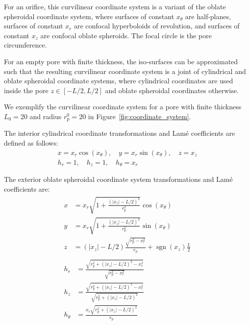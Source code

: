 \documentclass[10pt, a4paper]{article}
\begin{document}
\begin{multicols}{2}
For an orifice, this curvilinear coordinate system is a variant of the oblate spheroidal coordinate system, where surfaces of constant $x_{\theta}$ are half-planes, surfaces of constant $x_{r}$ are confocal hyperboloids of revolution, and surfaces of constant $x_{z}$ are confocal oblate spheroids.
The focal circle is the pore circumference.

For an empty pore with finite thickness, the iso-surfaces can be approximated such that the resulting curvilinear coordinate system is a joint of cylindrical and oblate spheroidal coordinate systems,
where cylindrical coordinates are used inside the pore $z \in [-L/2, L/2]$ and oblate spheroidal coordinates otherwise.

We exemplify the curvilinear coordinate system for a pore with finite thickness $L_{0} = 20$ and radius $r_{\text{p}}^{0} = 20$ in Figure~\ref{fig:coordinate_system}.

The interior cylindrical coordinate transformations and Lam\'e coefficients are defined as follows:
\begin{gather}
    \label{eq:cyl_transformation_1}
    x = x_r \cos(x_{\theta}), \quad
    y = x_r \sin(x_{\theta}), \quad
    z = x_z
    \\
    \label{eq:cyl_transformation_2}
    h_r = 1, \quad
    h_z = 1, \quad
    h_{\theta} = x_r
\end{gather}

The exterior oblate spheroidal coordinate system transformations and Lam\'e coefficients are:
\begin{gather}
    \begin{aligned}\label{eq:oblate_spheroid_transformation_1}
        x &= x_r
        \sqrt{1 + \frac{(|x_z| - L/2)^2}{r_{\text{p}}^2}}
        \cos(x_{\theta})
        \\
        y &= x_r
        \sqrt{1 + \frac{(|x_z| - L/2)^2}{r_{\text{p}}^2}}
        \sin(x_{\theta})
        \\
        z &= (|x_z| - L/2) \frac{\sqrt{r_{\text{p}}^2 - x_r^2}}{r_{\text{p}}} + \operatorname{sgn}(x_z) \frac{L}{2}
    \end{aligned}
    \\[4pt]
    \begin{aligned}\label{eq:oblate_spheroid_transformation_2}
        h_r &= \frac{\sqrt{r_{\text{p}}^2 + (|x_z| - L/2)^2 - x_r^2}}{\sqrt{r_{\text{p}}^2 - x_r^2}}
        \\
        h_z &= \frac{\sqrt{r_{\text{p}}^2 + (|x_z| - L/2)^2 - x_r^2}}{\sqrt{r_{\text{p}}^2 + (|x_z| - L/2)^2}}
        \\
        h_{\theta} &= \frac{x_r \sqrt{r_{\text{p}}^2 + (|x_z| - L/2)^2}}{r_{\text{p}}}
    \end{aligned}
\end{gather}


\end{multicols}
\end{document}
